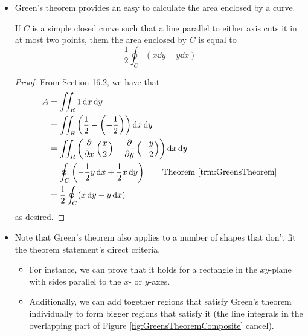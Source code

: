 \documentclass[../main.tex]{subfiles}
\begin{document}
\begin{itemize}
\begin{thm}
\begin{proof}
\begin{equation*}
            \end{equation*}
            as desired.
        \end{proof}
    \end{thm}
    \item Green's theorem provides an easy to calculate the area enclosed by a curve.
    \begin{cly}
        If $C$ is a simple closed curve such that a line parallel to either axis cuts it in at most two points, them the area enclosed by $C$ is equal to
        \begin{equation*}
            \frac{1}{2}\oint_C(x\dd{y}-y\dd{x})
        \end{equation*}
        \begin{proof}
            From Section 16.2, we have that
            \begin{align*}
                A &= \iint_R1\dd{x}\dd{y}\\
                &= \iint_R\left( \frac{1}{2}-\left( -\frac{1}{2} \right) \right)\dd{x}\dd{y}\\
                &= \iint_R\left( \pdv{x}\left( \frac{x}{2} \right)-\pdv{y}\left( -\frac{y}{2} \right) \right)\dd{x}\dd{y}\\
                &= \oint_C\left( -\frac{1}{2}y\dd{x}+\frac{1}{2}x\dd{y} \right)\tag*{Theorem \ref{trm:GreensTheorem}}\\
                &= \frac{1}{2}\oint_C(x\dd{y}-y\dd{x})
            \end{align*}
            as desired.
        \end{proof}
    \end{cly}
    \item Note that Green's theorem also applies to a number of shapes that don't fit the theorem statement's direct criteria.
    \begin{itemize}
        \item For instance, we can prove that it holds for a rectangle in the $xy$-plane with sides parallel to the $x$- or $y$-axes.
        \item Additionally, we can add together regions that satisfy Green's theorem individually to form bigger regions that satisfy it (the line integrals in the overlapping part of Figure \ref{fig:GreensTheoremComposite} cancel).
        \begin{figure}[h!]
            \centering
\end{figure}
\end{itemize}
\end{itemize}
\end{document}
